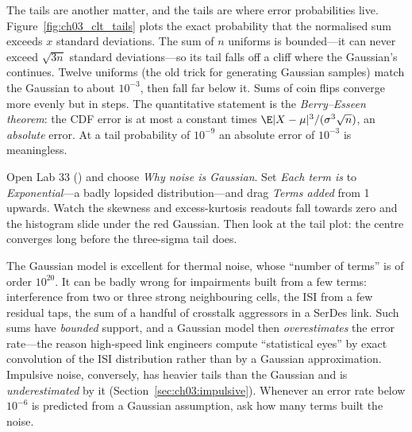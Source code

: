 The tails are another matter, and the tails are where error probabilities live.
Figure~\ref{fig:ch03_clt_tails} plots the exact probability that the normalised sum exceeds $x$
standard deviations. The sum of $n$ uniforms is bounded---it can never exceed $\sqrt{3n}$ standard
deviations---so its tail falls off a cliff where the Gaussian's continues. Twelve uniforms (the old
trick for generating Gaussian samples) match the Gaussian to about $10^{-3}$, then fall far below
it. Sums of coin flips converge more evenly but in steps. The quantitative statement is the
\emph{Berry--Esseen theorem}: the CDF error is at most a constant times
$\E|X-\mu|^3/(\sigma^3\sqrt n)$, an \emph{absolute} error. At a tail probability of $10^{-9}$ an
absolute error of $10^{-3}$ is meaningless.


\begin{tryit}
Open Lab 33 () and choose \emph{Why noise is Gaussian}. Set
\emph{Each term is} to \emph{Exponential}---a badly lopsided distribution---and drag \emph{Terms
added} from 1 upwards. Watch the skewness and excess-kurtosis readouts fall towards zero and the
histogram slide under the red Gaussian. Then look at the tail plot: the centre converges long before
the three-sigma tail does.
\end{tryit}

\begin{pitfall}
The Gaussian model is excellent for thermal noise, whose ``number of terms'' is of order
$10^{20}$. It can be badly wrong for impairments built from a few terms: interference from two or
three strong neighbouring cells, the ISI from a few residual taps, the sum of a handful of crosstalk
aggressors in a SerDes link. Such sums have \emph{bounded} support, and a Gaussian model then
\emph{overestimates} the error rate---the reason high-speed link engineers compute ``statistical
eyes'' by exact convolution of the ISI distribution rather than by a Gaussian approximation.
Impulsive noise, conversely, has heavier tails than the Gaussian and is \emph{underestimated} by it
(Section~\ref{sec:ch03:impulsive}). Whenever an error rate below $10^{-6}$ is predicted from a
Gaussian assumption, ask how many terms built the noise.
\end{pitfall}

